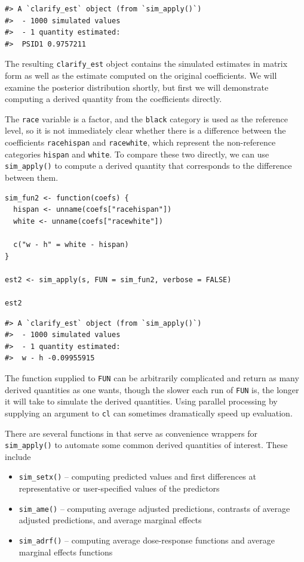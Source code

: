 \begin{verbatim}
#> A `clarify_est` object (from `sim_apply()`)
#>  - 1000 simulated values
#>  - 1 quantity estimated:                
#>  PSID1 0.9757211
\end{verbatim}

The resulting \texttt{clarify\_est} object contains the simulated estimates in matrix form as well as the estimate computed on the original coefficients. We will examine the posterior distribution shortly, but first we will demonstrate computing a derived quantity from the coefficients directly.

The \texttt{race} variable is a factor, and the \texttt{black} category is used as the reference level, so it is not immediately clear whether there is a difference between the coefficients \texttt{racehispan} and \texttt{racewhite}, which represent the non-reference categories \texttt{hispan} and \texttt{white}. To compare these two directly, we can use \texttt{sim\_apply()} to compute a derived quantity that corresponds to the difference between them.

\begin{verbatim}
sim_fun2 <- function(coefs) {
  hispan <- unname(coefs["racehispan"])
  white <- unname(coefs["racewhite"])
  
  c("w - h" = white - hispan)
}

est2 <- sim_apply(s, FUN = sim_fun2, verbose = FALSE)

est2
\end{verbatim}

\begin{verbatim}
#> A `clarify_est` object (from `sim_apply()`)
#>  - 1000 simulated values
#>  - 1 quantity estimated:                  
#>  w - h -0.09955915
\end{verbatim}

The function supplied to \texttt{FUN} can be arbitrarily complicated and return as many derived quantities as one wants, though the slower each run of \texttt{FUN} is, the longer it will take to simulate the derived quantities. Using parallel processing by supplying an argument to \texttt{cl} can sometimes dramatically speed up evaluation.

There are several functions in  that serve as convenience wrappers for \texttt{sim\_apply()} to automate some common derived quantities of interest. These include

\begin{itemize}
\item
  \texttt{sim\_setx()} -- computing predicted values and first differences at representative or user-specified values of the predictors
\item
  \texttt{sim\_ame()} -- computing average adjusted predictions, contrasts of average adjusted predictions, and average marginal effects
\item
  \texttt{sim\_adrf()} -- computing average dose-response functions and average marginal effects functions
\end{itemize}

